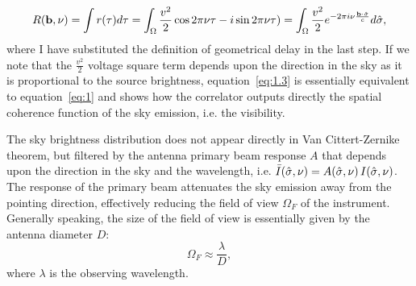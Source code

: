 \begin{equation}
R ({\bf b}, \nu) = \int r(\tau) d\tau = \int_\Omega \frac{v^2}{2} \cos{2\pi \nu \tau} - i\sin{2\pi \nu \tau}) = \int_\Omega \frac{v^2}{2} e^{-2 \pi i \nu \frac{{\bf b} \cdot {\hat {\bf \sigma}}}{c}} d \hat{\bf \sigma},
\label{eq:1.3}
\end{equation}
where I have substituted the definition of geometrical delay in the last step. If we note that the $\frac{v^2}{2}$ voltage square term depends upon the direction in the sky as it is proportional to the source brightness, equation~\ref{eq:1.3} is essentially equivalent to equation~\ref{eq:1} and shows how the correlator outputs directly the spatial coherence function of the sky emission, i.e. the visibility.  

The sky brightness distribution does not appear directly in Van Cittert-Zernike theorem, but filtered by the antenna primary beam response $A$ that depends upon the direction in the sky and the wavelength, i.e. ${\bar I} (\hat{\bf \sigma}, \nu) = A (\hat{\bf \sigma}, \nu)  \, I (\hat{\bf \sigma}, \nu)$. The response of the primary beam attenuates the sky emission away from the pointing direction, effectively reducing the field of view $\Omega_F$ of the instrument. Generally speaking, the size of the field of view is essentially given by the antenna diameter $D$: 
\begin{equation}
\Omega_F \approx \frac{\lambda}{D},
\label{eq:2}
\end{equation}
where $\lambda$ is the observing wavelength.

